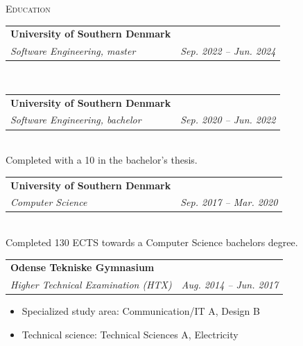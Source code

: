 \documentclass[11pt]{article}
\makeatletter
\newcommand{\resumeSubheading}[4]{
  \noindent\begin{tabular*}{0.98\textwidth}[t]{l@{\extracolsep{\fill}}r}
    \noindent \textbf{#1} & #2 \\ \vspace{-3pt} 
    \noindent \textit{\small#3} & \textit{\small #4} 
  \end{tabular*}\vspace{7pt}
}
\makeatother
\begin{document}
\vspace{0.5cm}


\noindent\large{\scshape{Education}} \newline
\noindent{\rule[0.3cm]{\textwidth}{0.4pt}}

\resumeSubheading{University of Southern Denmark}{}{Software Engineering, master}{Sep.
2022 -- Jun. 2024}\\\vspace{0.25cm}

\resumeSubheading{University of Southern Denmark}{}{Software Engineering, bachelor}{Sep.
2020 -- Jun. 2022}\\\vspace{0.25cm}
{\indent\small Completed with a 10 in the bachelor's thesis.}

\resumeSubheading{University of Southern Denmark}{}{Computer Science}{Sep. 2017
-- Mar. 2020}\\\vspace{0.25cm} 
{\indent\small Completed 130 ECTS towards a Computer Science bachelors degree.}
\vspace{0.3cm}

\resumeSubheading{Odense Tekniske Gymnasium}{}{Higher Technical
Examination (HTX)}{Aug. 2014 -- Jun. 2017}
{\small \begin{itemize}\vspace{-0.25cm}
  \setlength{\itemsep}{-1pt}
  \item Specialized study area: Communication/IT A, Design B

  \item Technical science: Technical Sciences A, Electricity
\end{itemize}
} \vspace{0.5cm}
\end{document}
